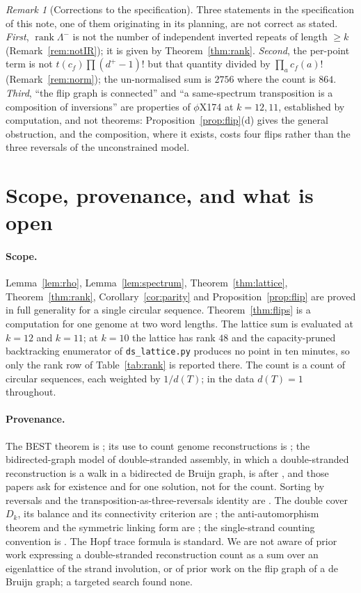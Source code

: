 \documentclass[11pt]{article}
\theoremstyle{plain}
\theoremstyle{definition}
\theoremstyle{remark}
\newtheorem{remark}[theorem]{Remark}
\newcommand{\rank}{\operatorname{rank}}
\newcommand{\Lm}{\Lambda^{-}}
\begin{document}
\begin{remark}[Corrections to the specification]\label{rem:corrections}
Three statements in the specification of this note, one of them originating in its planning,
are not correct as stated. \emph{First}, $\rank\Lm$ is not the number of independent inverted
repeats of length $\ge k$ (Remark~\ref{rem:notIR}); it is given by Theorem~\ref{thm:rank}.
\emph{Second}, the per-point term is not $t(c_f)\prod(d^+-1)!$ but that quantity divided by
$\prod_a c_f(a)!$ (Remark~\ref{rem:norm}); the un-normalised sum is $2756$ where the count is
$864$. \emph{Third}, ``the flip graph is connected'' and ``a same-spectrum transposition is a
composition of inversions'' are properties of $\phi$X174 at $k=12,11$, established by
computation, and not theorems: Proposition~\ref{prop:flip}(d) gives the general obstruction,
and the composition, where it exists, costs four flips rather than the three reversals of the
unconstrained model.
\end{remark}

\section{Scope, provenance, and what is open}

\paragraph{Scope.} Lemma~\ref{lem:rho}, Lemma~\ref{lem:spectrum}, Theorem~\ref{thm:lattice},
Theorem~\ref{thm:rank}, Corollary~\ref{cor:parity} and Proposition~\ref{prop:flip} are proved
in full generality for a single circular sequence. Theorem~\ref{thm:flips} is a computation
for one genome at two word lengths. The lattice sum is evaluated at $k=12$ and $k=11$; at
$k=10$ the lattice has rank $48$ and the capacity-pruned backtracking enumerator of
\texttt{ds\_lattice.py} produces no point in ten minutes, so only the rank row of
Table~\ref{tab:rank} is reported there. The count is a count of circular sequences, each
weighted by $1/d(T)$; in the data $d(T)=1$ throughout.

\paragraph{Provenance.} The BEST theorem is \cite{AEdB,SmithTutte}; its use to count genome
reconstructions is \cite{KSP}; the bidirected-graph model of double-stranded assembly, in
which a double-stranded reconstruction is a walk in a bidirected de Bruijn graph, is
\cite{MGMB07} after \cite{KM95}, and those papers ask for existence and for one solution, not
for the count. Sorting by reversals and the transposition-as-three-reversals identity are
\cite{BP96,HP99}. The double cover $D_k$, its balance and its connectivity criterion are
\cite{Bio6}; the anti-automorphism theorem and the symmetric linking form are \cite{Bio7}; the
single-strand counting convention is \cite{Bio1}. The Hopf trace formula is standard. We are
not aware of prior work expressing a double-stranded reconstruction count as a sum over an
eigenlattice of the strand involution, or of prior work on the flip graph of a de Bruijn
graph; a targeted search found none.
\end{document}
